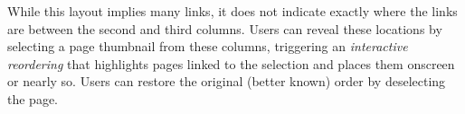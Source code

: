 While this layout implies many links, it does not indicate exactly where the links are between the second and third columns. Users can reveal these locations by selecting a page thumbnail from these columns, triggering an \textit{interactive reordering} that highlights pages linked to the selection and places them onscreen or nearly so. Users can restore the original (better known) order by deselecting the page.


